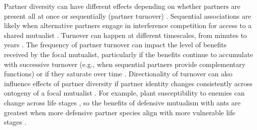 \documentclass[11pt]{article}
\begin{document}
Partner diversity can have different effects depending on whether partners are present all at once or sequentially (partner turnover) \citep{Djieto-Lordon2005, Ness2006, Bruna2014,Barrett2015,Ushio2020,Dattilo2014}. 
Sequential associations are likely when alternative partners engage in interference competition for access to a shared mutualist \cite{Kiers2003,Batstone2018,Tgaard2015,Wulff2008}. 
Turnover can happen at different timescales, from minutes to years \citep{Oliveira1999,Horvitz1986}. 
The frequency of partner turnover can impact the level of benefits received by the focal mutualist, particularly if the benefits continue to accumulate with successive turnover (e.g., when sequential partners provide complementary functions) or if they saturate over time \citep{Sachs2004,Fiala1994}.
Directionality of turnover can also influence effects of partner diversity if partner identity changes consistently across ontogeny of a focal mutualist \citep{Fonseca2003,Noe1994,Dejean2008}.
For example, plant susceptibility to enemies can change across life stages \citep{Boege2005,Barton2010}, so the benefits of defensive mutualism with ants are greatest when more defensive partner species align with more vulnerable life stages \citep{Djieto-Lordon2005,Dejean2008}.
\end{document}
